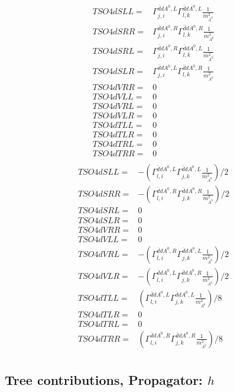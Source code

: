\documentclass[A4,landscape]{article}
\begin{document}
\begin{align} 
  TSO4dSLL= & \Gamma^{\bar{d}d A^0 ,L}_{j, i} \Gamma^{\bar{d}d A^0 ,L}_{l, k} \frac{1}{m^2_{A^0}} \\ 
  TSO4dSRR= & \Gamma^{\bar{d}d A^0 ,R}_{j, i} \Gamma^{\bar{d}d A^0 ,R}_{l, k} \frac{1}{m^2_{A^0}} \\ 
  TSO4dSRL= & \Gamma^{\bar{d}d A^0 ,R}_{j, i} \Gamma^{\bar{d}d A^0 ,L}_{l, k} \frac{1}{m^2_{A^0}} \\ 
  TSO4dSLR= & \Gamma^{\bar{d}d A^0 ,L}_{j, i} \Gamma^{\bar{d}d A^0 ,R}_{l, k} \frac{1}{m^2_{A^0}} \\ 
  TSO4dVRR= & 0 \\ 
  TSO4dVLL= & 0 \\ 
  TSO4dVRL= & 0 \\ 
  TSO4dVLR= & 0 \\ 
  TSO4dTLL= & 0 \\ 
  TSO4dTLR= & 0 \\ 
  TSO4dTRL= & 0 \\ 
  TSO4dTRR= & 0 \\ 
\end{align} 
\begin{align} 
  TSO4dSLL= & -(\Gamma^{\bar{d}d A^0 ,L}_{l, i} \Gamma^{\bar{d}d A^0 ,L}_{j, k} \frac{1}{m^2_{A^0}})/2 \\ 
  TSO4dSRR= & -(\Gamma^{\bar{d}d A^0 ,R}_{l, i} \Gamma^{\bar{d}d A^0 ,R}_{j, k} \frac{1}{m^2_{A^0}})/2 \\ 
  TSO4dSRL= & 0 \\ 
  TSO4dSLR= & 0 \\ 
  TSO4dVRR= & 0 \\ 
  TSO4dVLL= & 0 \\ 
  TSO4dVRL= & -(\Gamma^{\bar{d}d A^0 ,R}_{l, i} \Gamma^{\bar{d}d A^0 ,L}_{j, k} \frac{1}{m^2_{A^0}})/2 \\ 
  TSO4dVLR= & -(\Gamma^{\bar{d}d A^0 ,L}_{l, i} \Gamma^{\bar{d}d A^0 ,R}_{j, k} \frac{1}{m^2_{A^0}})/2 \\ 
  TSO4dTLL= & (\Gamma^{\bar{d}d A^0 ,L}_{l, i} \Gamma^{\bar{d}d A^0 ,L}_{j, k} \frac{1}{m^2_{A^0}})/8 \\ 
  TSO4dTLR= & 0 \\ 
  TSO4dTRL= & 0 \\ 
  TSO4dTRR= & (\Gamma^{\bar{d}d A^0 ,R}_{l, i} \Gamma^{\bar{d}d A^0 ,R}_{j, k} \frac{1}{m^2_{A^0}})/8 \\ 
\end{align} 
\subsection{Tree contributions, Propagator: $h$} 
\end{document}
